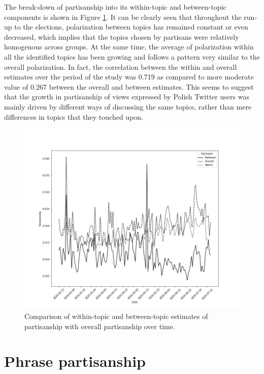 \documentclass{article}
\begin{document}
	The break-down of partisanship into its within-topic and between-topic components is shown in Figure \ref{fig:partisanship_within_between}. It can be clearly seen that throughout the run-up to the elections, polarization between topics has remained constant or even decreased, which implies that the topics chosen by partisans were relatively homogenous across groups. At the same time, the average of polarization within all the identified topics has been growing and follows a pattern very similar to the overall polarization. In fact, the correlation between the within and overall estimates over the period of the study was 0.719 as compared to more moderate value of 0.267 between the overall and between estimates. This seems to suggest that the growth in partisanship of views expressed by Polish Twitter users was mainly driven by different ways of discussing the same topics, rather than mere differences in topics that they touched upon.
	
	\begin{figure}[!h]
		\includegraphics[width=\columnwidth]{figures/partisanship_within_between.png}
		\caption{Comparison of within-topic and between-topic estimates of partisanship with overall partisanship over time.}
		\label{fig:partisanship_within_between}
	\end{figure}

	\clearpage
	
	\section*{Phrase partisanship}
	
\end{document}
